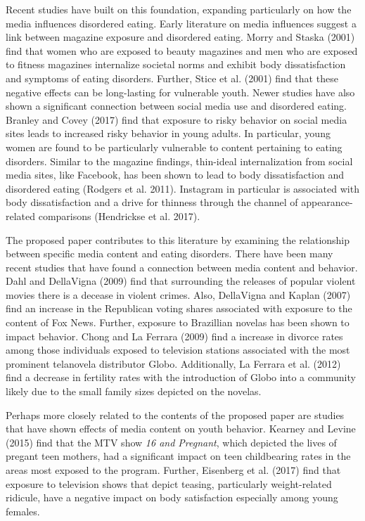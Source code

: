 \documentclass[12pt]{article}
\begin{document}
Recent studies have built on this foundation, expanding particularly on how the media influences disordered eating. Early literature on media influences suggest a link between magazine exposure and disordered eating. Morry and Staska (2001) find that women who are exposed to beauty magazines and men who are exposed to fitness magazines internalize societal norms and exhibit body dissatisfaction and symptoms of eating disorders. Further, Stice et al. (2001) find that these negative effects can be long-lasting for vulnerable youth. Newer studies have also shown a significant connection between social media use and disordered eating. Branley and Covey (2017) find that exposure to risky behavior on social media sites leads to increased risky behavior in young adults. In particular, young women are found to be particularly vulnerable to content pertaining to eating disorders. Similar to the magazine findings, thin-ideal internalization from social media sites, like Facebook, has been shown to lead to body dissatisfaction and disordered eating (Rodgers et al. 2011). Instagram in particular is associated with body dissatisfaction and a drive for thinness through the channel of appearance-related comparisons (Hendrickse et al. 2017).

The proposed paper contributes to this literature by examining the relationship between specific media content and eating disorders. There have been many recent studies that have found a connection between media content and behavior. Dahl and DellaVigna (2009) find that surrounding the releases of popular violent movies there is a decease in violent crimes. Also, DellaVigna and Kaplan (2007) find an increase in the Republican voting shares associated with exposure to the content of Fox News. Further, exposure to Brazillian novelas has been shown to impact behavior. Chong and La Ferrara (2009) find a increase in divorce rates among those individuals exposed to television stations associated with the most prominent telanovela distributor Globo. Additionally, La Ferrara et al. (2012) find a decrease in fertility rates with the introduction of Globo into a community likely due to the small family sizes depicted on the novelas.

Perhaps more closely related to the contents of the proposed paper are studies that have shown effects of media content on youth behavior. Kearney and Levine (2015) find that the MTV show \textit{16 and Pregnant}, which depicted the lives of pregant teen mothers, had a significant impact on teen childbearing rates in the areas most exposed to the program. Further,  Eisenberg et al. (2017) find that exposure to television shows that depict teasing, particularly weight-related ridicule, have a negative impact on body satisfaction especially among young females.
\end{document}
